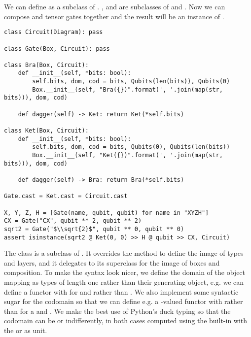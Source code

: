 \begin{example}\label{example:circuit-diagrams}
We can define  as a subclass of . ,  and  are subclasses of  and .
Now we can compose and tensor gates together and the result will be an instance of .

\begin{verbatim}
class Circuit(Diagram): pass

class Gate(Box, Circuit): pass

class Bra(Box, Circuit):
    def __init__(self, *bits: bool):
        self.bits, dom, cod = bits, Qubits(len(bits)), Qubits(0)
        Box.__init__(self, "Bra({})".format(', '.join(map(str, bits))), dom, cod)

    def dagger(self) -> Ket: return Ket(*self.bits)

class Ket(Box, Circuit):
    def __init__(self, *bits: bool):
        self.bits, dom, cod = bits, Qubits(0), Qubits(len(bits))
        Box.__init__(self, "Ket({})".format(', '.join(map(str, bits))), dom, cod)

    def dagger(self) -> Bra: return Bra(*self.bits)

Gate.cast = Ket.cast = Circuit.cast

X, Y, Z, H = [Gate(name, qubit, qubit) for name in "XYZH"]
CX = Gate("CX", qubit ** 2, qubit ** 2)
sqrt2 = Gate("$\\sqrt{2}$", qubit ** 0, qubit ** 0)
assert isinstance(sqrt2 @ Ket(0, 0) >> H @ qubit >> CX, Circuit)
\end{verbatim}
\end{example}

The  class is a subclass of .
It overrides the  method to define the image of types and layers, and it delegates to its superclass for the image of boxes and composition.
To make the syntax look nicer, we define the domain of the object mapping as types of length one rather than their generating object, e.g. we can define a functor with  for  and  rather than .
We also implement some syntactic sugar for the codomain so that we can define e.g. a -valued functor with  rather than  for a  and .
We make the best use of Python's duck typing so that the codomain can be  or  indifferently, in both cases computed using the built-in  with the  or \py{()} as unit.

